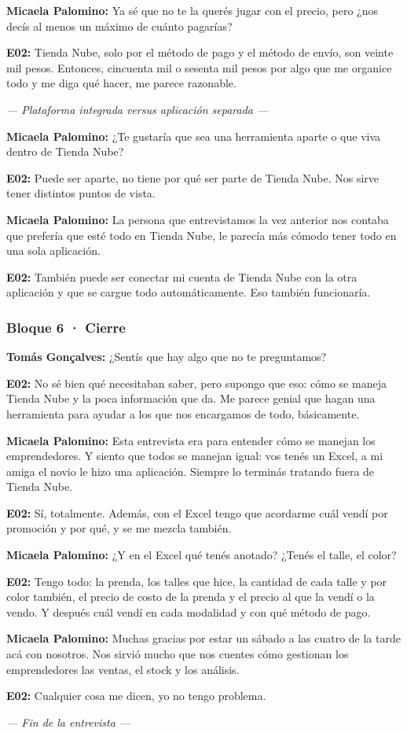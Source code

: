 \noindent\textbf{Micaela Palomino:} Ya sé que no te la querés jugar con el precio, pero ¿nos decís al menos un máximo de cuánto pagarías?

\noindent\textbf{E02:} Tienda Nube, solo por el método de pago y el método de envío, son veinte mil pesos. Entonces, cincuenta mil o sesenta mil pesos por algo que me organice todo y me diga qué hacer, me parece razonable.

\noindent\textit{--- Plataforma integrada versus aplicación separada ---}

\noindent\textbf{Micaela Palomino:} ¿Te gustaría que sea una herramienta aparte o que viva dentro de Tienda Nube?

\noindent\textbf{E02:} Puede ser aparte, no tiene por qué ser parte de Tienda Nube. Nos sirve tener distintos puntos de vista.

\noindent\textbf{Micaela Palomino:} La persona que entrevistamos la vez anterior nos contaba que prefería que esté todo en Tienda Nube, le parecía más cómodo tener todo en una sola aplicación.

\noindent\textbf{E02:} También puede ser conectar mi cuenta de Tienda Nube con la otra aplicación y que se cargue todo automáticamente. Eso también funcionaría.

\subsubsection*{Bloque 6 · Cierre}

\noindent\textbf{Tomás Gonçalves:} ¿Sentís que hay algo que no te preguntamos?

\noindent\textbf{E02:} No sé bien qué necesitaban saber, pero supongo que eso: cómo se maneja Tienda Nube y la poca información que da. Me parece genial que hagan una herramienta para ayudar a los que nos encargamos de todo, básicamente.

\noindent\textbf{Micaela Palomino:} Esta entrevista era para entender cómo se manejan los emprendedores. Y siento que todos se manejan igual: vos tenés un Excel, a mi amiga el novio le hizo una aplicación. Siempre lo terminás tratando fuera de Tienda Nube.

\noindent\textbf{E02:} Sí, totalmente. Además, con el Excel tengo que acordarme cuál vendí por promoción y por qué, y se me mezcla también.

\noindent\textbf{Micaela Palomino:} ¿Y en el Excel qué tenés anotado? ¿Tenés el talle, el color?

\noindent\textbf{E02:} Tengo todo: la prenda, los talles que hice, la cantidad de cada talle y por color también, el precio de costo de la prenda y el precio al que la vendí o la vendo. Y después cuál vendí en cada modalidad y con qué método de pago.

\noindent\textbf{Micaela Palomino:} Muchas gracias por estar un sábado a las cuatro de la tarde acá con nosotros. Nos sirvió mucho que nos cuentes cómo gestionan los emprendedores las ventas, el stock y los análisis.

\noindent\textbf{E02:} Cualquier cosa me dicen, yo no tengo problema.

\begin{center}\textit{--- Fin de la entrevista ---}\end{center}
